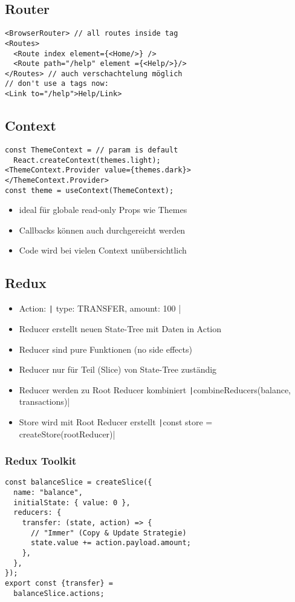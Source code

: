 \begin{multicols*}{4}
\subsection{Router}
\begin{verbatim}
<BrowserRouter> // all routes inside tag
<Routes>
  <Route index element={<Home/>} />
  <Route path="/help" element ={<Help/>}/>
</Routes> // auch verschachtelung möglich
// don't use a tags now:
<Link to="/help">Help/Link>
\end{verbatim}

\subsection{Context}
\begin{verbatim}
const ThemeContext = // param is default
  React.createContext(themes.light);
<ThemeContext.Provider value={themes.dark}>
</ThemeContext.Provider>
const theme = useContext(ThemeContext);
\end{verbatim}
\begin{itemize}
    \item ideal für globale read-only Props wie Themes
    \item Callbacks können auch durchgereicht werden
    \item Code wird bei vielen Context unübersichtlich
\end{itemize}

\subsection{Redux}
\begin{itemize}
    \item Action: \texttt|{ type: TRANSFER, amount: 100 }|
    \item Reducer erstellt neuen State-Tree mit Daten in Action
    \item Reducer sind pure Funktionen (no side effects)
    \item Reducer nur für Teil (Slice) von State-Tree zuständig
    \item Reducer werden zu Root Reducer kombiniert \texttt|combineReducers({balance, transactions})|
    \item Store wird mit Root Reducer erstellt \texttt|const store = createStore(rootReducer)|
\end{itemize}

\subsubsection{Redux Toolkit}
\begin{verbatim}
const balanceSlice = createSlice({
  name: "balance",
  initialState: { value: 0 },
  reducers: {
    transfer: (state, action) => {
      // "Immer" (Copy & Update Strategie)
      state.value += action.payload.amount;
    },
  },
});
export const {transfer} =
  balanceSlice.actions;
\end{verbatim}


\end{multicols*}
